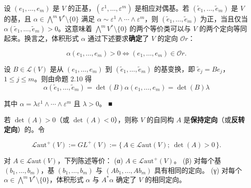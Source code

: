 \begin{remark}

\begin{items}
\item

设 $ (e_{1},\ldots,e_{m}) $ 是 $ V $ 的正基，$ (\varepsilon^{1},\ldots,\varepsilon^{m}) $ 是相应对偶基。若 $ (\widetilde{e}_{1},\ldots,\widetilde{e}_{m}) $ 是 $ V $ 的基，且 $ \alpha \in \bigwedge^{m}V^{*}\setminus\{0\} $ 满足 $ \alpha \sim \varepsilon^{1}\wedge\cdots\wedge\varepsilon^{m} $，则 $ (\widetilde{e}_{1},\ldots,\widetilde{e}_{m}) $ 为正，当且仅当 $ \alpha(\widetilde{e}_{1},\ldots,\widetilde{e}_{m}) > 0 $。这意味着 $ \bigwedge^{m}V^{*}\setminus\{0\} $ 的两个等价类可以与 $ V $ 的两个定向等同起来。换言之，体积形式 $ \alpha $ 通过下述要求\textbf{确定}了 $ V $ 的定向 $ \mathcal{O}r $：

\[
\alpha(e_{1},\ldots,e_{m}) > 0 \iff (e_{1},\ldots,e_{m}) \in \mathcal{O}r .
\]

\proofhead
设 $ B \in \mathcal{L}(V) $ 是从 $ (e_{1},\ldots,e_{m}) $ 到 $ (\widetilde{e}_{1},\ldots,\widetilde{e}_{m}) $ 的基变换，即 $ \widetilde{e}_{j} = Be_{j} $，$ 1 \le j \le m $。则由命题 2.10 得
\[
\alpha(\widetilde{e}_{1},\ldots,\widetilde{e}_{m}) = \det(B)\alpha(e_{1},\ldots,e_{m}) = \det(B)\lambda
\]

其中 $ \alpha = \lambda\varepsilon^{1}\wedge\cdots\wedge\varepsilon^{m} $ 且 $ \lambda > 0 $。 \nobreak\hspace{0.35em}■

\item

若 $ \det(A) > 0 $（或 $ \det(A) < 0 $），则称 $ V $ 的自同构 $ A $ 是\textbf{保持定向}（或\textbf{反转定向}）的。令

\[
\mathcal{L}\mathrm{aut}^{+}(V) := GL^{+}(V) := \{\, A \in \mathcal{L}\mathrm{aut}(V) ;\ \det(A) > 0 \,\} .
\]
\end{items}

\begin{subitems}
\item

对 $ A \in \mathcal{L}\mathrm{aut}(V) $，下列陈述等价：
(α) $ A \in \mathcal{L}\mathrm{aut}^{+}(V) $。
(β) 对每个基 $ (b_{1},\ldots,b_{m}) $，基 $ (b_{1},\ldots,b_{m}) $ 与 $ (Ab_{1},\ldots,Ab_{m}) $ 具有相同的定向。
(γ) 对每个 $ \alpha \in \bigwedge^{m}V^{*}\setminus\{0\} $，体积形式 $ \alpha $ 与 $ A^{*}\alpha $ 确定了 $ V $ 的相同定向。

\item


\end{subitems}
\end{remark}
